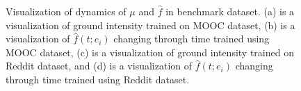 \begin{figure}[!h]
    \hfill
    \caption{Visualization of dynamics of $\mu$ and $\hat{f}$ in benchmark dataset. (a) is a visualization of ground intensity trained on MOOC dataset, (b) is a visualization of $\hat{f}(t;e_i)$ changing through time trained using MOOC dataset, (c) is a visualization of ground intensity trained on Reddit dataset, and (d) is a visualization of $\hat{f}(t;e_i)$ changing through time trained using Reddit dataset.}
\end{figure}

